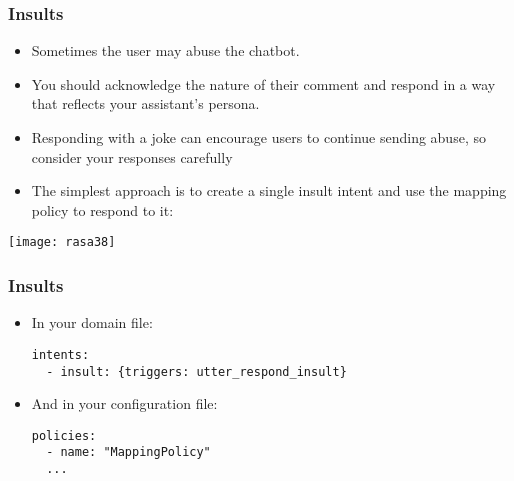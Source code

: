 \begin{frame}[fragile]\frametitle{Insults}
\begin{itemize}
\item Sometimes the user may abuse the chatbot.
\item You should acknowledge the nature of their comment and respond in a way that reflects your assistant’s persona. 
\item Responding with a joke can encourage users to continue sending abuse, so consider your responses carefully
\item The simplest approach is to create a single insult intent and use the mapping policy to respond to it:
\end{itemize}

\begin{center}
\texttt{[image: rasa38]}
\end{center}
\end{frame}

 \begin{frame}[fragile]\frametitle{Insults}
\begin{itemize}
\item In your domain file:
\begin{lstlisting}
intents:
  - insult: {triggers: utter_respond_insult}
\end{lstlisting}
\item And in your configuration file:
\begin{lstlisting}
policies:
  - name: "MappingPolicy"
  ...
\end{lstlisting}
\end{itemize}

\end{frame}